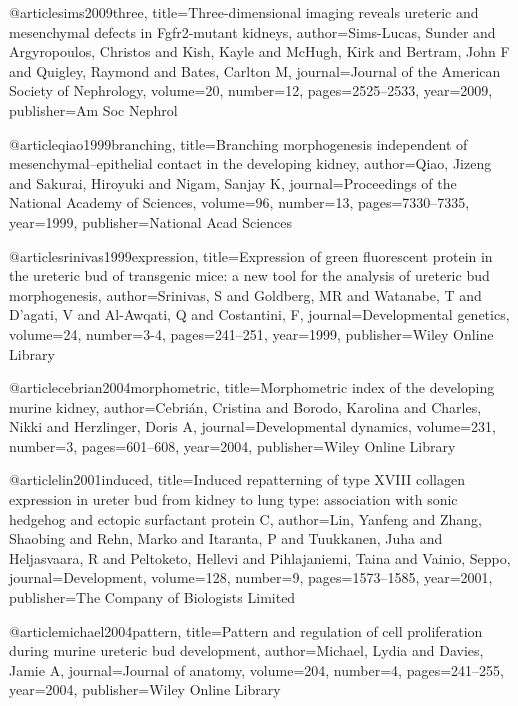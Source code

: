 @article{sims2009three,
  title={Three-dimensional imaging reveals ureteric and mesenchymal defects in Fgfr2-mutant kidneys},
  author={Sims-Lucas, Sunder and Argyropoulos, Christos and Kish, Kayle and McHugh, Kirk and Bertram, John F and Quigley, Raymond and Bates, Carlton M},
  journal={Journal of the American Society of Nephrology},
  volume={20},
  number={12},
  pages={2525--2533},
  year={2009},
  publisher={Am Soc Nephrol}
}

@article{qiao1999branching,
  title={Branching morphogenesis independent of mesenchymal--epithelial contact in the developing kidney},
  author={Qiao, Jizeng and Sakurai, Hiroyuki and Nigam, Sanjay K},
  journal={Proceedings of the National Academy of Sciences},
  volume={96},
  number={13},
  pages={7330--7335},
  year={1999},
  publisher={National Acad Sciences}
}

@article{srinivas1999expression,
  title={Expression of green fluorescent protein in the ureteric bud of transgenic mice: a new tool for the analysis of ureteric bud morphogenesis},
  author={Srinivas, S and Goldberg, MR and Watanabe, T and D'agati, V and Al-Awqati, Q and Costantini, F},
  journal={Developmental genetics},
  volume={24},
  number={3-4},
  pages={241--251},
  year={1999},
  publisher={Wiley Online Library}
}

@article{cebrian2004morphometric,
  title={Morphometric index of the developing murine kidney},
  author={Cebri{\'a}n, Cristina and Borodo, Karolina and Charles, Nikki and Herzlinger, Doris A},
  journal={Developmental dynamics},
  volume={231},
  number={3},
  pages={601--608},
  year={2004},
  publisher={Wiley Online Library}
}

@article{lin2001induced,
  title={Induced repatterning of type XVIII collagen expression in ureter bud from kidney to lung type: association with sonic hedgehog and ectopic surfactant protein C},
  author={Lin, Yanfeng and Zhang, Shaobing and Rehn, Marko and Itaranta, P and Tuukkanen, Juha and Heljasvaara, R and Peltoketo, Hellevi and Pihlajaniemi, Taina and Vainio, Seppo},
  journal={Development},
  volume={128},
  number={9},
  pages={1573--1585},
  year={2001},
  publisher={The Company of Biologists Limited}
}

@article{michael2004pattern,
  title={Pattern and regulation of cell proliferation during murine ureteric bud development},
  author={Michael, Lydia and Davies, Jamie A},
  journal={Journal of anatomy},
  volume={204},
  number={4},
  pages={241--255},
  year={2004},
  publisher={Wiley Online Library}
}


